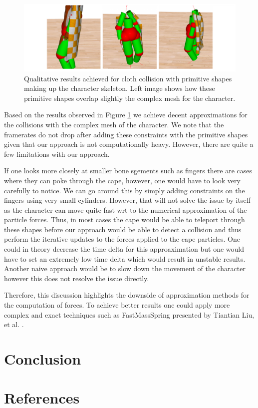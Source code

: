 \documentclass{article}
\begin{document}
\begin{figure}[ht]
  \centering
  \includegraphics[width=\linewidth]{figs/qualitative_results.pdf}
  \caption{Qualitative results achieved for cloth collision with primitive shapes making up the character skeleton.
  Left image shows how these primitive shapes overlap slightly the complex mesh for the character.}
  \label{fig:results/results}
\end{figure}

Based on the results observed in Figure \ref{fig:results/results} we achieve decent approximations for the
collisions with the complex mesh of the character. We note that the framerates do not drop after adding these
constraints with the primitive shapes given that our approach is not computationally heavy. However, there are
quite a few limitations with our approach.

If one looks more closely at smaller bone sgements such as fingers there are cases where they can poke through
the cape, however, one would have to look very carefully to notice. We can go around this by simply adding constraints
on the fingers using very small cylinders. However, that will not solve the issue by itself as the character can move
quite fast wrt to the numerical approximation of the particle forces. Thus, in most cases the cape would be able to
teleport through these shapes before our approach would be able to detect a collision and thus perform the iterative
updates to the forces applied to the cape particles. One could in theory decrease the time delta for this approaximation
but one would have to set an extremely low time delta which would result in unstable results. Another naive approach
would be to slow down the movement of the character however this does not resolve the issue directly.

Therefore, this discussion highlights the downside of approximation methods for the computation of forces. To achieve
better results one could apply more complex and exact techniques such as FastMassSpring presented by Tiantian Liu, et al.
\cite{FastMassSpring}.



\section{Conclusion}


\section*{References}


{
  \small
}

\end{document}
